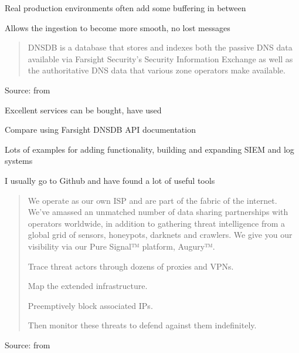 \documentclass[Screen16to9,17pt]{foils}
\begin{document}

\begin{list2}
\item Real production environments often add some buffering in between
\item Allows the ingestion to become more smooth, no lost messages
\end{list2}




\begin{quote}
DNSDB is a database that stores and indexes both the passive DNS data available via Farsight Security’s Security Information Exchange as well as the authoritative DNS data that various zone operators make available.
\end{quote}
Source: from 
\begin{list2}
  \item Excellent services can be bought, have used 
\item Compare using 
  Farsight DNSDB API documentation
\item {}
\item Lots of examples for adding functionality, building and expanding SIEM and log systems
\item I usually go to Github and have found a lot of useful tools
\end{list2}



\begin{quote}
  We operate as our own ISP and are part of the fabric of the internet. We’ve amassed an unmatched number of data sharing partnerships with operators worldwide, in addition to gathering threat intelligence from a global grid of sensors, honeypots, darknets and crawlers. We give you our visibility via our Pure Signal™ platform, Augury™.

\begin{list2}
\item Trace threat actors through dozens of proxies and VPNs.
\item Map the extended infrastructure.
\item Preemptively block associated IPs.
\item Then monitor these threats to defend against them indefinitely.
\end{list2}
\end{quote}
Source: from 
\end{document}
